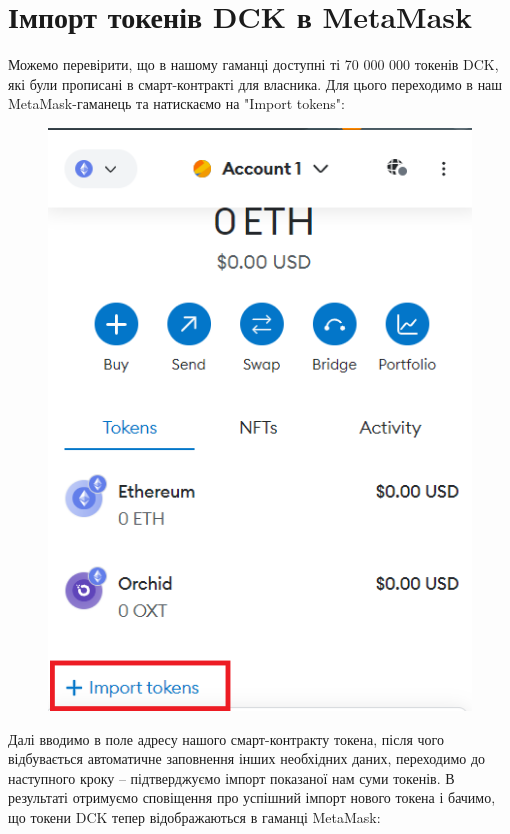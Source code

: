 \section{Імпорт токенів DCK в MetaMask}

Можемо перевірити, що в нашому гаманці доступні ті 70 000 000 токенів DCK, які були прописані в смарт-контракті для власника. Для цього переходимо в наш MetaMask-гаманець та натискаємо на "Import tokens":

    \begin{figure}[ht]
        \centering
        \includegraphics[scale=0.5]{IMAGES/metamask01.png}
        \label{fig_vsc}
    \end{figure}

Далі вводимо в поле адресу нашого смарт-контракту токена, після чого відбувається автоматичне заповнення інших необхідних даних, переходимо до наступного кроку -- підтверджуємо імпорт показаної нам суми токенів. В результаті отримуємо сповіщення про успішний імпорт нового токена і бачимо, що токени DCK тепер відображаються в гаманці MetaMask:

